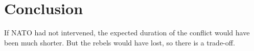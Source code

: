 \section{Conclusion}
\label{conclusion}

If NATO had not intervened, the expected duration of the conflict would have been much shorter. But the rebels would have lost, so there is a trade-off. 